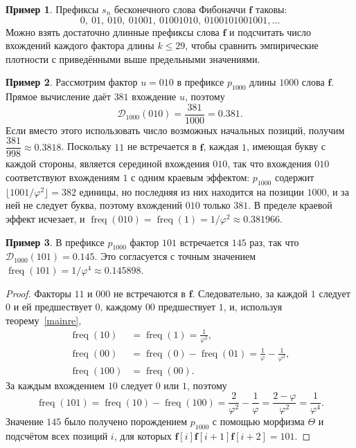 \documentclass[a4paper,14pt]{extreport}
\theoremstyle{plain}
\theoremstyle{definition}
\newtheorem{example}{Пример}
\theoremstyle{remark}
\begin{document}
\begin{example}
	Префиксы $s_n$ бесконечного слова Фибоначчи $\mathbf{f}$ таковы:
	\begin{equation}\label{fib}
		0,\ 01,\ 010,\ 01001,\ 01001010,\ 0100101001001,\dots
	\end{equation}
	Можно взять достаточно длинные префиксы слова $\mathbf{f}$ и подсчитать число вхождений каждого фактора
	длины $k\le 29$, чтобы сравнить эмпирические плотности с приведёнными выше предельными значениями.
\end{example}

\begin{example}
	Рассмотрим фактор $u=010$ в префиксе $p_{1000}$ длины $1000$ слова $\mathbf f$.
	Прямое вычисление даёт $381$ вхождение $u$, поэтому
	\begin{equation}
		\mathscr{D}_{1000}(010) = \frac{381}{1000} = 0.381 .
	\end{equation}
	Если вместо этого использовать число возможных начальных позиций, получим
	$\dfrac{381}{998} \approx 0.3818$.
	Поскольку $11$ не встречается в $\mathbf f$, каждая $1$, имеющая букву с каждой стороны, является серединой вхождения $010$, так что вхождения $010$ соответствуют вхождениям $1$ с одним краевым эффектом: $p_{1000}$ содержит $\lfloor 1001/\varphi^{2}\rfloor=382$ единицы, но последняя из них находится на позиции $1000$, и за ней не следует буква, поэтому вхождений $010$ только $381$. В пределе краевой эффект исчезает, и $\operatorname{freq}(010)=\operatorname{freq}(1)=1/\varphi^{2}\approx0.381966$.
\end{example}

\begin{example}\label{ex:freq-101}
	В префиксе $p_{1000}$ фактор $101$ встречается $145$ раз, так что $\mathscr D_{1000}(101)=0.145$.
	Это согласуется с точным значением $\operatorname{freq}(101)=1/\varphi^{4}\approx0.145898$.
\end{example}

\begin{proof}
	Факторы $11$ и $000$ не встречаются в $\mathbf f$. Следовательно, за каждой $1$ следует $0$ и ей предшествует $0$, каждому $00$ предшествует $1$, и, используя теорему~\ref{mainre},
	\begin{align}
		\operatorname{freq}(10)&=\operatorname{freq}(1)=\frac1{\varphi^{2}},\\
		\operatorname{freq}(00)&=\operatorname{freq}(0)-\operatorname{freq}(01)=\frac1\varphi-\frac1{\varphi^{2}},\\
		\operatorname{freq}(100)&=\operatorname{freq}(00).
	\end{align}
	За каждым вхождением $10$ следует $0$ или $1$, поэтому
	\begin{equation}
		\operatorname{freq}(101)=\operatorname{freq}(10)-\operatorname{freq}(100)
		=\frac{2}{\varphi^{2}}-\frac1\varphi=\frac{2-\varphi}{\varphi^{2}}=\frac1{\varphi^{4}} .
	\end{equation}
	Значение $145$ было получено порождением $p_{1000}$ с помощью морфизма $\Theta$ и подсчётом
	всех позиций $i$, для которых $\mathbf f[i]\mathbf f[i+1]\mathbf f[i+2]=101$.
\end{proof}
\end{document}
